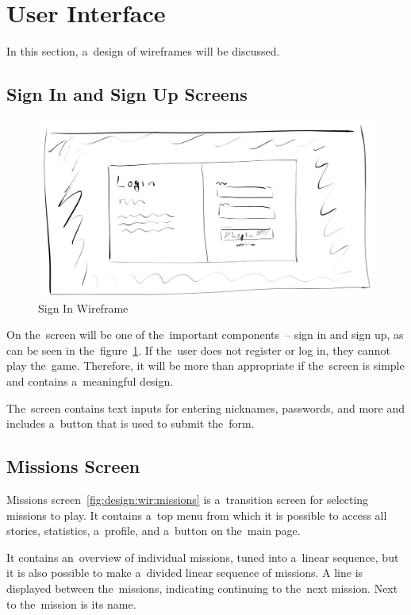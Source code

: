 \section{User Interface}
\label{design:ui}

In this section, a~design of wireframes will be discussed.

\subsection{Sign In and Sign Up Screens}

\begin{figure}
    \centering
    \includegraphics[width=1\linewidth]{assets/design/ui/wir_login.png}
    \caption{Sign In Wireframe}
    \label{fig:design:wir:login}
\end{figure}

On the~screen will be one of the~important components~-- sign in and sign up, as can be seen in the~figure~\ref{fig:design:wir:login}.
If the~user does not register or log in, they cannot play the~game.
Therefore, it will be more than appropriate if the~screen is simple and contains a~meaningful design.

The~screen contains text inputs for entering nicknames, passwords, and more and includes a~button that is used to submit the~form.

\subsection{Missions Screen}

Missions screen~\ref{fig:design:wir:missions} is a~transition screen for selecting missions to play.
It contains a~top menu from which it is possible to access all stories, statistics, a~profile, and a~button on the~main page.

It contains an~overview of individual missions, tuned into a~linear sequence, but it is also possible to make a~divided linear sequence of missions.
A line is displayed between the~missions, indicating continuing to the~next mission.
Next to the~mission is its name.

